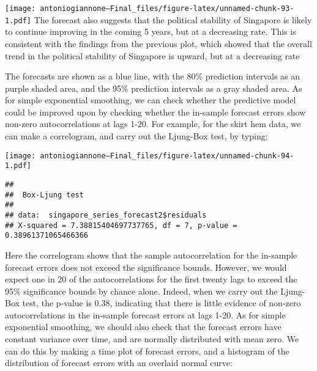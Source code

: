 \documentclass[
]{article}
\newenvironment{Shaded}{\begin{snugshade}}{\end{snugshade}}
\newcommand{\AttributeTok}[1]{\textcolor[rgb]{0.13,0.29,0.53}{#1}}
\newcommand{\CommentTok}[1]{\textcolor[rgb]{0.56,0.35,0.01}{\textit{#1}}}
\newcommand{\DecValTok}[1]{\textcolor[rgb]{0.00,0.00,0.81}{#1}}
\newcommand{\FunctionTok}[1]{\textcolor[rgb]{0.13,0.29,0.53}{\textbf{#1}}}
\newcommand{\NormalTok}[1]{#1}
\newcommand{\SpecialCharTok}[1]{\textcolor[rgb]{0.81,0.36,0.00}{\textbf{#1}}}
\newcommand{\StringTok}[1]{\textcolor[rgb]{0.31,0.60,0.02}{#1}}
\begin{document}
\texttt{[image: antoniogiannone---Final\_files/figure-latex/unnamed-chunk-93-1.pdf]}
The forecast also suggests that the political stability of Singapore is
likely to continue improving in the coming 5 years, but at a decreasing
rate. This is consistent with the findings from the previous plot, which
showed that the overall trend in the political stability of Singapore is
upward, but at a decreasing rate

The forecasts are shown as a blue line, with the 80\% prediction
intervals as an purple shaded area, and the 95\% prediction intervals as
a gray shaded area. As for simple exponential smoothing, we can check
whether the predictive model could be improved upon by checking whether
the in-sample forecast errors show non-zero autocorrelations at lags
1-20. For example, for the skirt hem data, we can make a correlogram,
and carry out the Ljung-Box test, by typing:

\begin{Shaded}
\end{Shaded}

\texttt{[image: antoniogiannone---Final\_files/figure-latex/unnamed-chunk-94-1.pdf]}

\begin{Shaded}
\end{Shaded}

\begin{verbatim}
## 
##  Box-Ljung test
## 
## data:  singapore_series_forecast2$residuals
## X-squared = 7.38815404697737765, df = 7, p-value = 0.38961371065466366
\end{verbatim}

Here the correlogram shows that the sample autocorrelation for the
in-sample forecast errors does not exceed the significance bounds.
However, we would expect one in 20 of the autocorrelations for the first
twenty lags to exceed the 95\% significance bounds by chance alone.
Indeed, when we carry out the Ljung-Box test, the p-value is 0.38,
indicating that there is little evidence of non-zero autocorrelations in
the in-sample forecast errors at lags 1-20. As for simple exponential
smoothing, we should also check that the forecast errors have constant
variance over time, and are normally distributed with mean zero. We can
do this by making a time plot of forecast errors, and a histogram of the
distribution of forecast errors with an overlaid normal curve:
\end{document}
